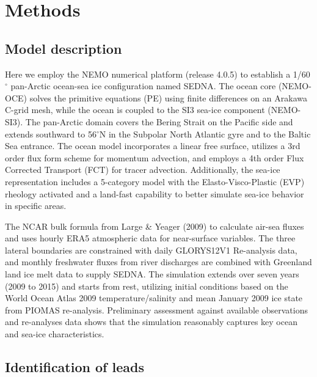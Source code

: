 \documentclass[draft]{agujournal2019}
\begin{document}
\section{Methods}
\subsection*{Model description}

Here we employ the NEMO numerical platform (release 4.0.5) to establish a 1/60$^\circ$ pan-Arctic ocean-sea ice configuration named SEDNA. The ocean core (NEMO-OCE) solves the primitive equations (PE) using finite differences on an Arakawa C-grid mesh, while the ocean is coupled to the SI3 sea-ice component (NEMO-SI3). The pan-Arctic domain covers the Bering Strait on the Pacific side and extends southward to 56$^\circ$N in the Subpolar North Atlantic gyre and to the Baltic Sea entrance. The ocean model incorporates a linear free surface, utilizes a 3rd order flux form scheme for momentum advection, and employs a 4th order Flux Corrected Transport (FCT) for tracer advection. Additionally, the sea-ice representation includes a 5-category model with the Elasto-Visco-Plastic (EVP) rheology activated and a land-fast capability to better simulate sea-ice behavior in specific areas.

The NCAR bulk formula from Large \& Yeager (2009) to calculate air-sea fluxes and uses hourly ERA5 atmospheric data for near-surface variables. The three lateral boundaries are constrained with daily GLORYS12V1 Re-analysis data, and monthly freshwater fluxes from river discharges are combined with Greenland land ice melt data to supply SEDNA. The simulation extends over seven years (2009 to 2015) and starts from rest, utilizing initial conditions based on the World Ocean Atlas 2009 temperature/salinity and mean January 2009 ice state from PIOMAS re-analysis. Preliminary assessment against available observations and re-analyses data shows that the simulation reasonably captures key ocean and sea-ice characteristics.


\subsection*{Identification of leads}
\end{document}
